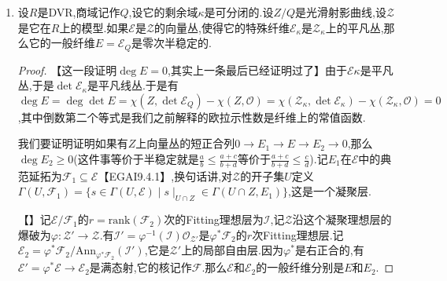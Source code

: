\begin{enumerate}
\begin{proof}
    	【EGAIII7.9.4】告诉我们局部诺特概形之间的紧合态射下,源端上的凝聚层的欧拉示性数是局部常值的,这里$\mathrm{Spec}R$上闭点的开邻域只有全集,于是得到$\deg\mathcal{E}_Q=\chi(\mathcal{E}_{\kappa})-r\chi(\mathscr{O}_{\mathcal{X}_{\kappa}})$,这里$\mathcal{E}_{\kappa}$是平凡丛,于是$\chi(\mathcal{E}_{\kappa})=r\chi(\mathscr{O}_{Y_{\kappa}})$(因为上同调和有限直和可交换),于是得到$\deg\mathscr{E}_Q=0$,进而从$E=\mathcal{E}_Q\otimes_Q\mathbb{C}_p$得到$\deg E=0$.类似的按照【EGAIII7.9.4】得到$\deg L=\deg L_Q$.接下来还剩下证明$\deg L_Q\le0$,而这是下一个命题.
    \end{proof}
    \item 设$R$是DVR,商域记作$Q$,设它的剩余域$\kappa$是可分闭的.设$Z/Q$是光滑射影曲线,设$\mathcal{Z}$是它在$R$上的模型.如果$\mathcal{E}$是$\mathcal{Z}$的向量丛,使得它的特殊纤维$\mathcal{E}_{\kappa}$是$\mathcal{Z}_{\kappa}$上的平凡丛,那么它的一般纤维$E=\mathcal{E}_Q$是零次半稳定的.
    \begin{proof}
    	
    	【这一段证明$\deg E=0$,其实上一条最后已经证明过了】由于$\mathcal{E}{\kappa}$是平凡丛,于是$\det\mathcal{E}_{\kappa}$是平凡线丛.于是有$\deg E=\deg\det E=\chi(Z,\det\mathcal{E}_Q)-\chi(Z,\mathscr{O})=\chi(\mathcal{Z}_{\kappa},\det\mathcal{E}_{\kappa})-\chi(\mathcal{Z}_{\kappa},\mathscr{O})=0$,其中倒数第二个等式是我们之前解释的欧拉示性数是纤维上的常值函数.
    	
    	\qquad
    	
    	我们要证明证明如果有$Z$上向量丛的短正合列$0\to E_1\to E\to E_2\to0$,那么$\deg E_2\ge0$(这件事等价于半稳定就是$\frac{a}{b}\le\frac{a+c}{b+d}$等价于$\frac{a+c}{b+d}\le\frac{c}{d}$).记$E_1$在$\mathcal{E}$中的典范延拓为$\mathscr{F}_1\subseteq\mathcal{E}$【EGAI9.4.1】,换句话讲,对$\mathcal{Z}$的开子集$U$定义$\Gamma(U,\mathscr{F}_1)=\{s\in\Gamma(U,\mathcal{E})\mid s\mid_{U\cap Z}\in\Gamma(U\cap Z,E_1)\}$,这是一个凝聚层.
    	
    	\qquad
    	
    	【】记$\mathcal{E}/\mathscr{F}_1$的$r=\mathrm{rank}(\mathscr{F}_2)$次的Fitting理想层为$\mathscr{I}$,记$\mathcal{Z}$沿这个凝聚理想层的爆破为$\varphi:\mathcal{Z}'\to\mathcal{Z}$.有$\mathscr{I}'=\varphi^{-1}(\mathcal{I})\mathscr{O}_{\mathcal{Z}'}$是$\varphi^*\mathscr{F}_2$的$r$次Fitting理想层.记$\mathcal{E}_2=\varphi^*\mathscr{F}_2/\mathrm{Ann}_{\varphi^*\mathscr{F}_2}(\mathscr{I}')$,它是$\mathcal{Z}'$上的局部自由层.因为$\varphi^*$是右正合的,有$\mathcal{E}'=\varphi^*\mathcal{E}\to\mathcal{E}_2$是满态射,它的核记作$\mathscr{F}$.那么$\mathcal{E}$和$\mathcal{E}_2$的一般纤维分别是$E$和$E_2$.
    	

\end{proof}
\end{enumerate}
